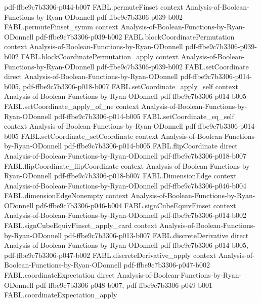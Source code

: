 \begin{theorem}
  {pdf-ffbe9c7b3306-p044-b007}
\proofstep
  {FABL.permuteFinset}
  {context}
  {Analysis-of-Boolean-Functions-by-Ryan-ODonnell}
  {pdf-ffbe9c7b3306-p039-b002}
\proofstep
  {FABL.permuteFinset_symm}
  {context}
  {Analysis-of-Boolean-Functions-by-Ryan-ODonnell}
  {pdf-ffbe9c7b3306-p039-b002}
\proofstep
  {FABL.blockCoordinatePermutation}
  {context}
  {Analysis-of-Boolean-Functions-by-Ryan-ODonnell}
  {pdf-ffbe9c7b3306-p039-b002}
\proofstep
  {FABL.blockCoordinatePermutation_apply}
  {context}
  {Analysis-of-Boolean-Functions-by-Ryan-ODonnell}
  {pdf-ffbe9c7b3306-p039-b002}
\proofstep
  {FABL.setCoordinate}
  {direct}
  {Analysis-of-Boolean-Functions-by-Ryan-ODonnell}
  {pdf-ffbe9c7b3306-p014-b005,
    pdf-ffbe9c7b3306-p018-b007}
\proofstep
  {FABL.setCoordinate_apply_self}
  {context}
  {Analysis-of-Boolean-Functions-by-Ryan-ODonnell}
  {pdf-ffbe9c7b3306-p014-b005}
\proofstep
  {FABL.setCoordinate_apply_of_ne}
  {context}
  {Analysis-of-Boolean-Functions-by-Ryan-ODonnell}
  {pdf-ffbe9c7b3306-p014-b005}
\proofstep
  {FABL.setCoordinate_eq_self}
  {context}
  {Analysis-of-Boolean-Functions-by-Ryan-ODonnell}
  {pdf-ffbe9c7b3306-p014-b005}
\proofstep
  {FABL.setCoordinate_setCoordinate}
  {context}
  {Analysis-of-Boolean-Functions-by-Ryan-ODonnell}
  {pdf-ffbe9c7b3306-p014-b005}
\proofstep
  {FABL.flipCoordinate}
  {direct}
  {Analysis-of-Boolean-Functions-by-Ryan-ODonnell}
  {pdf-ffbe9c7b3306-p018-b007}
\proofstep
  {FABL.flipCoordinate_flipCoordinate}
  {context}
  {Analysis-of-Boolean-Functions-by-Ryan-ODonnell}
  {pdf-ffbe9c7b3306-p018-b007}
\proofstep
  {FABL.DimensionEdge}
  {context}
  {Analysis-of-Boolean-Functions-by-Ryan-ODonnell}
  {pdf-ffbe9c7b3306-p046-b004}
\proofstep
  {FABL.dimensionEdgeNonempty}
  {context}
  {Analysis-of-Boolean-Functions-by-Ryan-ODonnell}
  {pdf-ffbe9c7b3306-p046-b004}
\proofstep
  {FABL.signCubeEquivFinset}
  {context}
  {Analysis-of-Boolean-Functions-by-Ryan-ODonnell}
  {pdf-ffbe9c7b3306-p014-b002}
\proofstep
  {FABL.signCubeEquivFinset_apply_card}
  {context}
  {Analysis-of-Boolean-Functions-by-Ryan-ODonnell}
  {pdf-ffbe9c7b3306-p013-b007}
\proofstep
  {FABL.discreteDerivative}
  {direct}
  {Analysis-of-Boolean-Functions-by-Ryan-ODonnell}
  {pdf-ffbe9c7b3306-p014-b005,
    pdf-ffbe9c7b3306-p047-b002}
\proofstep
  {FABL.discreteDerivative_apply}
  {context}
  {Analysis-of-Boolean-Functions-by-Ryan-ODonnell}
  {pdf-ffbe9c7b3306-p047-b002}
\proofstep
  {FABL.coordinateExpectation}
  {direct}
  {Analysis-of-Boolean-Functions-by-Ryan-ODonnell}
  {pdf-ffbe9c7b3306-p048-b007,
    pdf-ffbe9c7b3306-p049-b001}
\proofstep
  {FABL.coordinateExpectation_apply}

\end{theorem}

